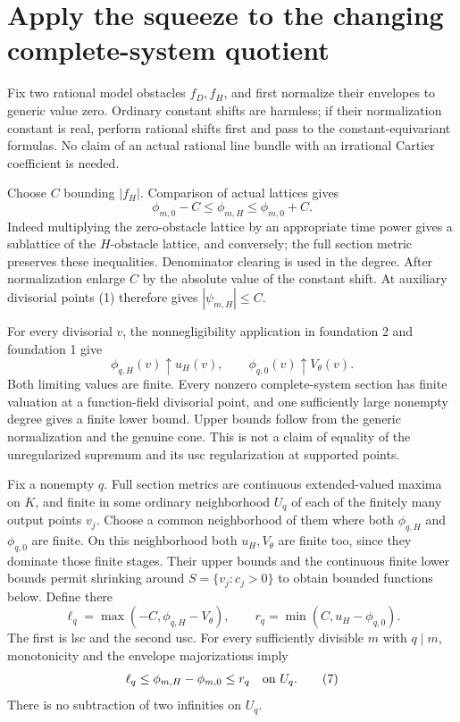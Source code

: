\documentclass[10pt]{article}
\begin{document}
\section{Apply the squeeze to the changing complete-system quotient}
Fix two rational model obstacles $f_D,f_H$, and first normalize their
envelopes to generic value zero. Ordinary constant shifts are harmless;
if their normalization constant is real, perform rational shifts first
and pass to the constant-equivariant formulas. No claim of an actual
rational line bundle with an irrational Cartier coefficient is needed.

Choose $C$ bounding $|f_H|$. Comparison of actual lattices gives
\[
       \phi_{m,0}-C\le\phi_{m,H}\le\phi_{m,0}+C.
 \tag{4}
\]
Indeed multiplying the zero-obstacle lattice by an appropriate time
power gives a sublattice of the $H$-obstacle lattice, and conversely;
the full section metric preserves these inequalities. Denominator
clearing is used in the degree. After normalization enlarge $C$ by the
absolute value of the constant shift. At auxiliary divisorial points
(1) therefore gives $|\psi_{m,H}|\le C$.

For every divisorial $v$, the nonnegligibility application in foundation
2 and foundation 1 give
\[
                \phi_{q,H}(v)\uparrow u_H(v),\qquad
                \phi_{q,0}(v)\uparrow V_\theta(v).
 \tag{5}
\]
Both limiting values are finite. Every nonzero complete-system section
has finite valuation at a function-field divisorial point, and one
sufficiently large nonempty degree gives a finite lower bound. Upper
bounds follow from the generic normalization and the genuine cone.
This is not a claim of equality of the unregularized supremum and its
usc regularization at supported points.

Fix a nonempty $q$. Full section metrics are continuous extended-valued
maxima on $K$, and finite in some ordinary neighborhood $U_q$ of each
of the finitely many output points $v_j$. Choose a common neighborhood
of them where both $\phi_{q,H}$ and $\phi_{q,0}$ are finite. On this
neighborhood both $u_H,V_\theta$ are finite too, since they dominate
those finite stages. Their upper bounds and the continuous finite lower
bounds permit shrinking around $S=\{v_j:c_j>0\}$ to obtain bounded
functions below. Define there
\[
 \ell_q=\max(-C,\phi_{q,H}-V_\theta),\qquad
 r_q=\min(C,u_H-\phi_{q,0}).                           \tag{6}
\]
The first is lsc and the second usc. For every sufficiently divisible
$m$ with $q\mid m$, monotonicity and the envelope majorizations imply
\[
 \ell_q\le \phi_{m,H}-\phi_{m,0}\le r_q\quad\hbox{on }U_q.
 \tag{7}
\]
There is no subtraction of two infinities on $U_q$.
\end{document}
